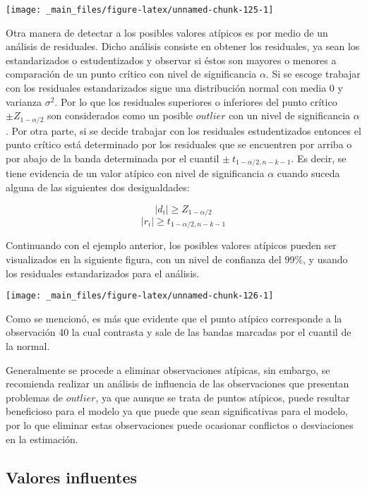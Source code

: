 \documentclass[
  a4paper,
  oneside,
  openany]{book}
\begin{document}
\begin{center}\texttt{[image: \_main\_files/figure-latex/unnamed-chunk-125-1]} \end{center}

Otra manera de detectar a los posibles valores atípicos es por medio de un análisis de residuales. Dicho análisis consiste en obtener los residuales, ya sean los estandarizados o estudentizados y observar si éstos son mayores o menores a comparación de un punto crítico con nivel de significancia \(\alpha\). Si se escoge trabajar con los residuales estandarizados sigue una distribución normal con media 0 y varianza \(\sigma^2\). Por lo que los residuales superiores o inferiores del punto crítico \(\pm Z_{1-\alpha/2}\) son considerados como un posible \(outlier\) con un nivel de significancia \(\alpha\). Por otra parte, si se decide trabajar con los residuales estudentizados entonces el punto crítico está determinado por los residuales que se encuentren por arriba o por abajo de la banda determinada por el cuantil \(\pm \ t_{1-\alpha/2,n-k-1}.\) Es decir, se tiene evidencia de un valor atípico con nivel de significancia \(\alpha\) cuando suceda alguna de las siguientes dos desigualdades:

\[\mid d_{i} \mid \geq Z_{1-\alpha/2}\]
\[\mid r_{i}\mid  \geq t_{1-\alpha/2,n-k-1}\]

Continuando con el ejemplo anterior, los posibles valores atípicos pueden ser visualizados en la siguiente figura, con un nivel de confianza del 99\%, y usando los residuales estandarizados para el análisis.

\begin{center}\texttt{[image: \_main\_files/figure-latex/unnamed-chunk-126-1]} \end{center}

Como se mencionó, es más que evidente que el punto atípico corresponde a la observación 40 la cual contrasta y sale de las bandas marcadas por el cuantil de la normal.

Generalmente se procede a eliminar observaciones atípicas, sin embargo, se recomienda realizar un análisis de influencia de las observaciones que presentan problemas de \(outlier\), ya que aunque se trata de puntos atípicos, puede resultar beneficioso para el modelo ya que puede que sean significativas para el modelo, por lo que eliminar estas observaciones puede ocasionar conflictos o desviaciones en la estimación.

\hypertarget{valores-influentes}{%
\subsection{Valores influentes}\label{valores-influentes}}
\end{document}
